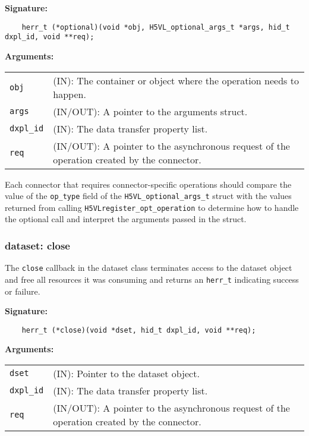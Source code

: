 \begin{mdframed}[style=bgbox]
\textbf{Signature:}
\begin{lstlisting}
    herr_t (*optional)(void *obj, H5VL_optional_args_t *args, hid_t dxpl_id, void **req);
\end{lstlisting}

\textbf{Arguments:}\\
\begin{tabular}{l p{13.5cm}}
  \texttt{obj} & (IN): The container or object where the operation needs to happen.\\
  \texttt{args} & (IN/OUT): A pointer to the arguments struct.\\
  \texttt{dxpl\_id} & (IN): The data transfer property list.\\
  \texttt{req} & (IN/OUT): A pointer to the asynchronous request of the operation created by the connector.\\
\end{tabular}
\end{mdframed}

Each connector that requires connector-specific operations should compare the
value of the {\tt op\_type} field of the {\tt H5VL\_optional\_args\_t} struct
with the values returned from calling {\tt H5VLregister\_opt\_operation} to
determine how to handle the optional call and interpret the arguments passed
in the struct.

\subsubsection{dataset: close}
The \texttt{close} callback in the dataset class terminates access
to the dataset object and free all resources it was consuming and
returns an \texttt{herr\_t} indicating success or failure.\bigskip

\begin{mdframed}[style=bgbox]
\textbf{Signature:}
\begin{lstlisting}
    herr_t (*close)(void *dset, hid_t dxpl_id, void **req);
\end{lstlisting}

\textbf{Arguments:}\\
\begin{tabular}{l p{13.5cm}}
  \texttt{dset} & (IN): Pointer to the dataset object.\\
  \texttt{dxpl\_id} & (IN): The data transfer property list.\\
  \texttt{req} & (IN/OUT): A pointer to the asynchronous request of the
  operation created by the connector.\\
\end{tabular}
\end{mdframed}

